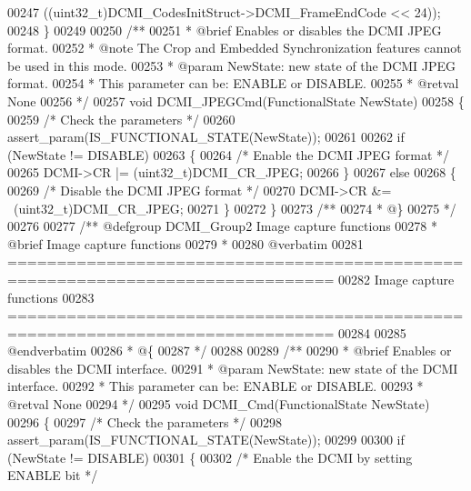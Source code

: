 \begin{DoxyCode}
00247                           ((uint32\_t)DCMI\_CodesInitStruct->DCMI\_FrameEndCode << 24));
00248 \}
00249 
00250 \textcolor{comment}{/**}
00251 \textcolor{comment}{  * @brief  Enables or disables the DCMI JPEG format.}
00252 \textcolor{comment}{  * @note   The Crop and Embedded Synchronization features cannot be used in this mode.  }
00253 \textcolor{comment}{  * @param  NewState: new state of the DCMI JPEG format. }
00254 \textcolor{comment}{  *          This parameter can be: ENABLE or DISABLE.}
00255 \textcolor{comment}{  * @retval None}
00256 \textcolor{comment}{  */}
00257 \textcolor{keywordtype}{void} DCMI_JPEGCmd(FunctionalState NewState)
00258 \{
00259   \textcolor{comment}{/* Check the parameters */}
00260   assert_param(IS\_FUNCTIONAL\_STATE(NewState));
00261 
00262   \textcolor{keywordflow}{if} (NewState != DISABLE)
00263   \{
00264     \textcolor{comment}{/* Enable the DCMI JPEG format */}
00265     DCMI->CR |= (uint32\_t)DCMI_CR_JPEG;
00266   \}
00267   \textcolor{keywordflow}{else}
00268   \{
00269     \textcolor{comment}{/* Disable the DCMI JPEG format */}
00270     DCMI->CR &= ~(uint32\_t)DCMI_CR_JPEG;
00271   \}
00272 \}
00273 \textcolor{comment}{/**}
00274 \textcolor{comment}{  * @\}}
00275 \textcolor{comment}{  */}
00276 
00277 \textcolor{comment}{/** @defgroup DCMI\_Group2 Image capture functions}
00278 \textcolor{comment}{ *  @brief   Image capture functions}
00279 \textcolor{comment}{ *}
00280 \textcolor{comment}{@verbatim   }
00281 \textcolor{comment}{ ===============================================================================}
00282 \textcolor{comment}{                                 Image capture functions}
00283 \textcolor{comment}{ ===============================================================================  }
00284 \textcolor{comment}{}
00285 \textcolor{comment}{@endverbatim}
00286 \textcolor{comment}{  * @\{}
00287 \textcolor{comment}{  */}
00288 
00289 \textcolor{comment}{/**}
00290 \textcolor{comment}{  * @brief  Enables or disables the DCMI interface.}
00291 \textcolor{comment}{  * @param  NewState: new state of the DCMI interface. }
00292 \textcolor{comment}{  *          This parameter can be: ENABLE or DISABLE.}
00293 \textcolor{comment}{  * @retval None}
00294 \textcolor{comment}{  */}
00295 \textcolor{keywordtype}{void} DCMI_Cmd(FunctionalState NewState)
00296 \{
00297   \textcolor{comment}{/* Check the parameters */}
00298   assert_param(IS\_FUNCTIONAL\_STATE(NewState));
00299 
00300   \textcolor{keywordflow}{if} (NewState != DISABLE)
00301   \{
00302     \textcolor{comment}{/* Enable the DCMI by setting ENABLE bit */}

\end{DoxyCode}
